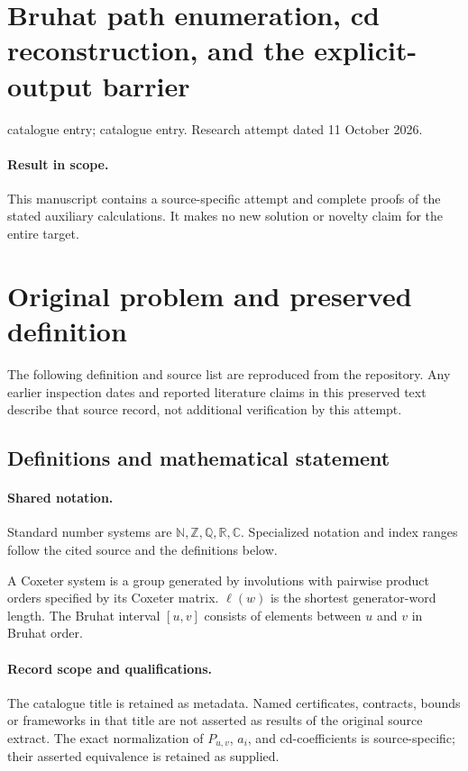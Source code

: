 \documentclass[11pt]{article}
\begin{document}
\section*{Bruhat path enumeration, cd reconstruction, and the explicit-output barrier}
\noindent catalogue entry; catalogue entry. Research attempt dated 11 October 2026.
\paragraph{Result in scope.}This manuscript contains a source-specific attempt and complete proofs of the stated auxiliary calculations. It makes no new solution or novelty claim for the entire target.
\section{Original problem and preserved definition}
The following definition and source list are reproduced from the repository. Any earlier inspection dates and reported literature claims in this preserved text describe that source record, not additional verification by this attempt.
\subsection{Definitions and mathematical statement}

\paragraph{Shared notation.}Standard number systems are $\mathbb N,\mathbb Z,\mathbb Q,\mathbb R,\mathbb C$. Specialized notation and index ranges follow the cited source and the definitions below.


A Coxeter system is a group generated by involutions with pairwise product orders specified by its Coxeter matrix. $\ell(w)$ is the shortest generator-word length. The Bruhat interval $[u,v]$ consists of elements between $u$ and $v$ in Bruhat order.
\paragraph{Record scope and qualifications.}
The catalogue title is retained as metadata. Named certificates, contracts, bounds or frameworks in that title are not asserted as results of the original source extract.
The exact normalization of $P_{u,v}$, $a_i$, and cd-coefficients is source-specific; their asserted equivalence is retained as supplied.
\end{document}

